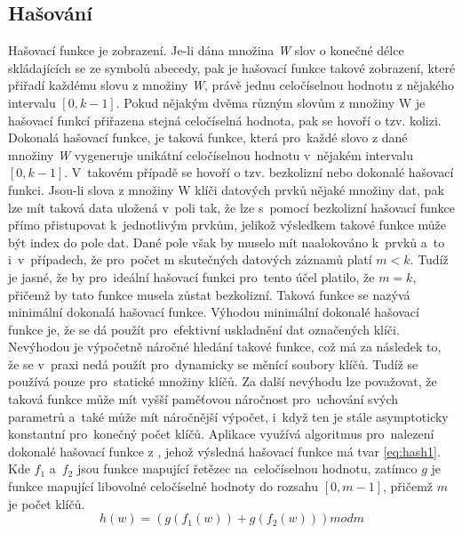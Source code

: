 \documentclass[11pt,twoside,a4paper]{book}
\begin{document}
\subsection {\label{SEC:hashN} Hašování}
Hašovací funkce je zobrazení. Je-li dána množina \textit{W} slov o konečné délce skládajících se ze symbolů abecedy, pak je hašovací funkce takové zobrazení, které přiřadí každému slovu z množiny \textit{W}, právě jednu celočíselnou hodnotu z nějakého intervalu $[0,k-1]$. Pokud nějakým dvěma různým slovům z množiny W je hašovací funkcí přiřazena stejná celočíselná hodnota, pak se hovoří o tzv. kolizi.
Dokonalá hašovací funkce, je taková funkce, která pro~každé slovo z dané množiny \textit{W} vygeneruje unikátní celočíselnou hodnotu v~nějakém intervalu $[0,k-1]$. V~takovém případě se hovoří o tzv. bezkolizní nebo dokonalé hašovací funkci. Jsou-li slova z množiny W klíči datových prvků nějaké množiny dat, pak lze mít taková data uložená v~poli tak, že lze s~pomocí bezkolizní hašovací funkce přímo přistupovat k~jednotlivým prvkům, jelikož výsledkem takové funkce může být index do pole dat. Dané pole však by muselo mít naalokováno k~prvků a~to i~v~případech, že pro~počet m skutečných datových záznamů platí $m<k$. Tudíž je jasné, že by pro~ideální hašovací funkci pro~tento účel platilo, že $m=k$, přičemž by tato funkce musela zůstat bezkolizní. Taková funkce se nazývá minimální dokonalá hašovací funkce.
Výhodou minimální dokonalé hašovací funkce je, že se dá použít pro~efektivní uskladnění dat označených klíči. Nevýhodou je výpočetně náročné hledání takové funkce, což má za následek to, že se v~praxi nedá použít pro~dynamicky se měnící soubory klíčů. Tudíž se používá pouze pro~statické množiny klíčů. Za další nevýhodu lze považovat, že taková funkce může mít vyšší paměťovou náročnost pro~uchování svých parametrů a~také může mít náročnější výpočet, i~když ten je stále asymptoticky konstantní pro~konečný počet klíčů.
Aplikace využívá algoritmus pro~nalezení dokonalé hašovací funkce z \cite{bib:hashPerfect}, jehož výsledná hašovací funkce má tvar \ref{eq:hash1}.
Kde $f_1$ a~$f_2$ jsou funkce mapující řetězec na~celočíselnou hodnotu, zatímco $g$ je funkce mapující libovolné celočíselné hodnoty do rozsahu $[0,m-1]$, přičemž $m$ je počet klíčů. 
\begin{equation} \label{eq:hash1}
h(w) = (g(f_1(w))+g(f_2(w))) mod m
\end{equation}
\end{document}

